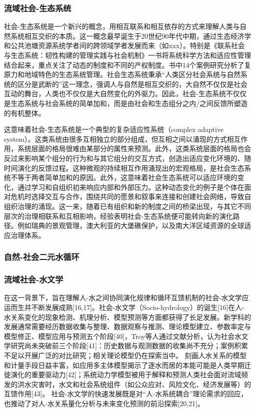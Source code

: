 \subsubsection*{流域社会-生态系统}
社会-生态系统是一个新兴的概念，用相互联系和相互依存的方式来理解人类与自然系统相互交织的本质。这一概念最早诞生于20世纪90年代中期，通过生态经济学和公共池塘资源系统学者间的跨领域学者发展而来（如xxx）。特别是《联系社会与生态系统：韧性构建的管理实践与社会机制》一书将系统科学方法和适应性管理结合起来，重点关注了动态的制度和不同的产权制度。书中14个案例研究分析了复原力和地域特色的生态系统管理。社会生态系统秉承“人类区分社会系统与自然系统的区分是武断的”这一理念，强调人与自然是相互交织的，大自然不仅仅是社会互动的舞台，人类也不仅仅是大自然变化的外驱力。因此，社会-生态系统不仅仅是生态系统与社会系统的简单加和，而是由社会和生态组分之内/之间反馈所塑造的有机整体。

这意味着社会-生态系统是一个典型的复杂适应性系统（complex adaptive system）。这类系统由很多互相独立的部分组成，但互相之间以涌现的方式相互作用，系统层面的格局很难由某部分的属性来预测。此外，这类系统层面的格局也会反过来影响某个组分的行为和与其它组分的交互方式，创造出适应变化环境的、随时间演化的反馈过程。这种微观的持续相互作用涌现出的宏观格局，是社会生态系统不等于两者简单加和的原因。此外，这意味着社会生态系统可以适应环境的变化，通过学习和自组织初来响应内部和外部压力。这种动态变化的例子是个体在面对危机时选择交互与合作，围绕共同的愿景和叙事来连接和创建社会网络，导致自组织治理的涌现。这一来，随着已有组织和新的制度之间的桥梁出现，与其它不同层次的治理相联系和互相影响，经验表明社会-生态系统便可能转向新的演化路径。例如瑞典的景观管理，澳大利亚的大堡礁保护，以及南大洋区域资源的全球适应治理体系。

\subsubsection*{自然-社会二元水循环}


\subsubsection*{流域社会-水文学}

在这一背景下，旨在理解人-水之间协同演化规律和循环互馈机制的社会-水文学应运而生并不断发展成熟[16,17]。社会-水文学（Socio-hydrology）的诞生[16]在人-水关系变化的现象检测、机理分析、模型预测等方面都获得了长足发展。新学科的发展通常需要经历数据收集与整理、数据观察与推测、理论模型建立、参数率定与模型修正、模型应用与预测五个阶段[40]，Troy等人通过文献分析，认为社会水文学研究尚未突破前三个阶段[41]：历史数据与观测数据的收集尚不充分；案例积累不足以开展广泛的对比研究；相关理论模型仍在探索当中。
刻画人水关系的模型和计量手段日益丰富，如应用多主体模型揭示了逐水而居的本能可能是人类早期迁徙演化的重要驱动力[42]；系统动力学模型被用于解释和预测人类社会面对流域频发的洪水灾害时，水文和社会系统组件（如公众应对、风险文化、经济发展等）的互馈作用[43]。 社会-水文学的快速发展既是对“人-水系统耦合”理论需求的回应，也推动了对人-水关系量化分析与未来变化预测的前沿探索[20,21]。
